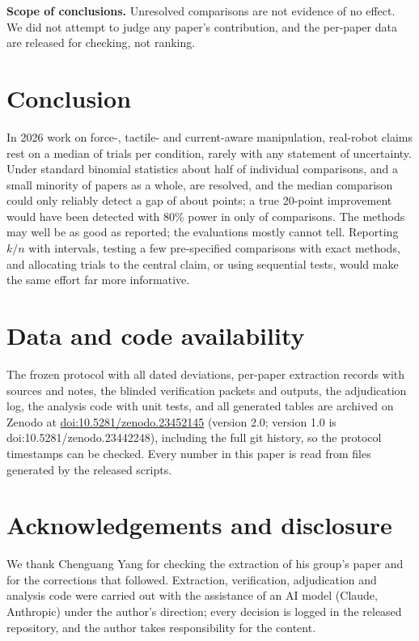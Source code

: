 \documentclass[11pt]{article}
\begin{document}
\textbf{Scope of conclusions.} Unresolved comparisons are not evidence of no effect. We did not attempt to judge any paper's contribution, and the per-paper data are released for checking, not ranking.

\section{Conclusion}
In 2026 work on force-, tactile- and current-aware manipulation, real-robot claims rest on a median of \AuditMedianN{} trials per condition, rarely with any statement of uncertainty. Under standard binomial statistics about half of individual comparisons, and a small minority of papers as a whole, are resolved, and the median comparison could only reliably detect a gap of about \AuditMedianMDD{} points; a true 20-point improvement would have been detected with 80\% power in only \AuditSharePowTwenty{} of comparisons. The methods may well be as good as reported; the evaluations mostly cannot tell. Reporting $k/n$ with intervals, testing a few pre-specified comparisons with exact methods, and allocating trials to the central claim, or using sequential tests, would make the same effort far more informative.

\section*{Data and code availability}
The frozen protocol with all dated deviations, per-paper extraction records with sources and notes, the blinded verification packets and outputs, the adjudication log, the analysis code with unit tests, and all generated tables are archived on Zenodo at \href{https://doi.org/10.5281/zenodo.23452145}{doi:10.5281/zenodo.23452145} (version 2.0; version 1.0 is doi:10.5281/zenodo.23442248), including the full git history, so the protocol timestamps can be checked. Every number in this paper is read from files generated by the released scripts.

\section*{Acknowledgements and disclosure}
We thank Chenguang Yang for checking the extraction of his group's paper and for the corrections that followed. Extraction, verification, adjudication and analysis code were carried out with the assistance of an AI model (Claude, Anthropic) under the author's direction; every decision is logged in the released repository, and the author takes responsibility for the content.
\end{document}
